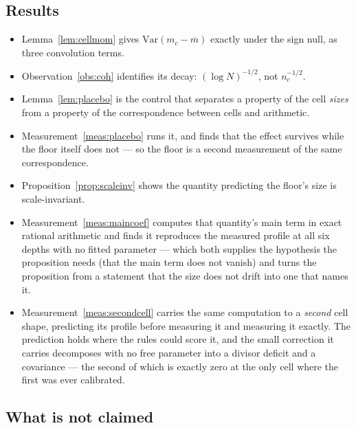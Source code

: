 \documentclass[11pt,a4paper]{article}
\theoremstyle{plain}
\theoremstyle{definition}
\theoremstyle{remark}
\begin{document}
\subsection{Results}

\begin{itemize}
\item Lemma~\ref{lem:cellmom} gives $\mathrm{Var}(m_c-\overline m)$
exactly under the sign null, as three convolution terms.
\item Observation~\ref{obs:coh} identifies its decay: $(\log N)^{-1/2}$,
not $n_c^{-1/2}$.
\item Lemma~\ref{lem:placebo} is the control that separates a
property of the cell \emph{sizes} from a property of the
correspondence between cells and arithmetic.
\item Measurement~\ref{meas:placebo} runs it, and finds that the
effect survives while the floor itself does not --- so the floor is a
second measurement of the same correspondence.
\item Proposition~\ref{prop:scaleinv} shows the quantity predicting
the floor's size is scale-invariant.
\item Measurement~\ref{meas:maincoef} computes that quantity's main
term in exact rational arithmetic and finds it reproduces the measured
profile at all six depths with no fitted parameter --- which both
supplies the hypothesis the proposition needs (that the main term does
not vanish) and turns the proposition from a statement that the size
does not drift into one that names it.
\item Measurement~\ref{meas:secondcell} carries the same computation to
a \emph{second} cell shape, predicting its profile before measuring it
and measuring it exactly. The prediction holds where the rules could
score it, and the small
correction it carries decomposes with no free parameter into a divisor
deficit and a covariance --- the second of which is exactly zero at the
only cell where the first was ever calibrated.
\end{itemize}

\subsection{What is not claimed}\label{sec:notclaimed}
\end{document}

